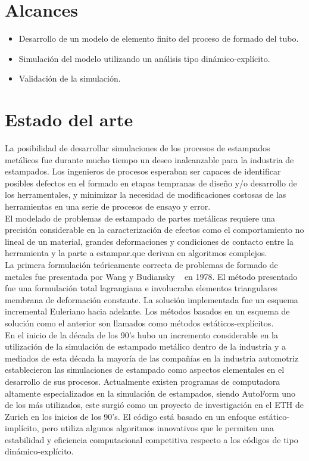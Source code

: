 \section{Alcances}

\begin{itemize}
\item Desarrollo de un modelo de elemento finito del proceso de formado del tubo.
\item Simulación del modelo utilizando un análisis tipo dinámico-explícito.
\item Validación de la simulación.
\end{itemize}


\section{Estado del arte}

La posibilidad de desarrollar simulaciones de los procesos de estampados metálicos fue durante mucho tiempo 
un deseo inalcanzable para la industria de estampados. Los ingenieros de procesos esperaban ser capaces de 
identificar posibles defectos en el formado en etapas tempranas de diseño y/o desarrollo de los herramentales, 
y minimizar la necesidad de modificaciones costosas de las herramientas en una serie de procesos de ensayo y error. \\

El modelado de problemas de estampado de partes metálicas requiere una precisión considerable en la caracterización 
de efectos como el comportamiento no lineal de un material, grandes deformaciones y condiciones de contacto entre la
herramienta y la parte a estampar.que derivan  en algoritmos complejos.\cite{banabic2000}\\

La primera formulación teóricamente correcta de problemas de formado de metales fue presentada por 
Wang y Budiansky ~\cite{wang1978} en 1978. El método presentado fue una formulación total lagrangiana 
e involucraba elementos triangulares membrana de deformación constante. La solución implementada fue 
un esquema incremental Euleriano hacia adelante. Los métodos basados en un 
esquema de solución como el anterior son llamados como métodos estáticos-explícitos.\\

En el inicio de la década de los 90's hubo un incremento considerable en la utilización de la simulación de estampado 
metálico dentro de la industria y a mediados de esta década la mayoría de las compañías en la industria automotriz 
establecieron las simulaciones de estampado como aspectos elementales en el desarrollo de sus procesos. 
Actualmente existen programas de computadora altamente especializados en la simulación de estampados, siendo AutoForm 
uno de los más utilizados, este surgió como un proyecto de investigación en el ETH de Zurich en los inicios de los 90's. 
El código está basado en un enfoque estático-implícito, pero utiliza algunos algoritmos innovativos que le permiten 
una estabilidad y eficiencia computacional competitiva respecto a los códigos de tipo dinámico-explícito.  ~\cite{banabic2000}\\

